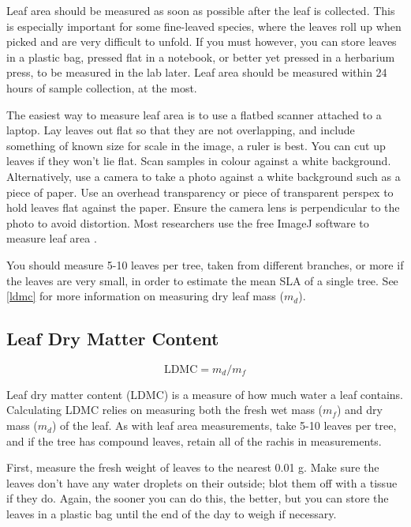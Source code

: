 \documentclass[11pt,a4paper]{article}
\begin{document}
Leaf area should be measured as soon as possible after the leaf is collected. This is especially important for some fine-leaved species, where the leaves roll up when picked and are very difficult to unfold. If you must however, you can store leaves in a plastic bag, pressed flat in a notebook, or better yet pressed in a herbarium press, to be measured in the lab later. Leaf area should be measured within 24 hours of sample collection, at the most.

The easiest way to measure leaf area is to use a flatbed scanner attached to a laptop. Lay leaves out flat so that they are not overlapping, and include something of known size for scale in the image, a ruler is best. You can cut up leaves if they won't lie flat. Scan samples in colour against a white background. Alternatively, use a camera to take a photo against a white background such as a piece of paper. Use an overhead transparency or piece of transparent perspex to hold leaves flat against the paper. Ensure the camera lens is perpendicular to the photo to avoid distortion. Most researchers use the free ImageJ software to measure leaf area \citep{Schneider2012}. 

You should measure \textapprox{}5-10 leaves per tree, taken from different branches, or more if the leaves are very small, in order to estimate the mean SLA of a single tree. See \autoref{ldmc} for more information on measuring dry leaf mass ($m_{d}$). 


\subsection{Leaf Dry Matter Content}
\label{ldmc}

\begin{equation}
	\text{LDMC} = m_{d} / m_{f}
\end{equation}

Leaf dry matter content (LDMC) is a measure of how much water a leaf contains. Calculating LDMC relies on measuring both the fresh wet mass ($m_{f}$) and dry mass ($m_{d}$) of the leaf. As with leaf area measurements, take 5-10 leaves per tree, and if the tree has compound leaves, retain all of the rachis in measurements.

First, measure the fresh weight of leaves to the nearest 0.01 g. Make sure the leaves don't have any water droplets on their outside; blot them off with a tissue if they do. Again, the sooner you can do this, the better, but you can store the leaves in a plastic bag until the end of the day to weigh if necessary.
\end{document}

